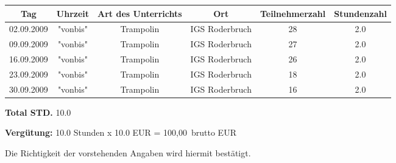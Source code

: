 \documentclass[a4paper,10pt,BCOR=0mm]{scrreprt}
\begin{document}
\begin{flushright}
\begin{tabular}{|c|c|c|c|c|c|}\hline
 \textbf{Tag}
&
 \textbf{Uhrzeit}
&
 \textbf{Art des Unterrichts}
&
\textbf{Ort}
&
\textbf{Teilnehmerzahl}
&
 \textbf{Stundenzahl}\\\hline\hline

02.09.2009
&
"vonbis"
&
Trampolin
&
IGS Roderbruch
&
28
&
2.0
\\\hline


09.09.2009
&
"vonbis"
&
Trampolin
&
IGS Roderbruch
&
27
&
2.0
\\\hline


16.09.2009
&
"vonbis"
&
Trampolin
&
IGS Roderbruch
&
26
&
2.0
\\\hline


23.09.2009
&
"vonbis"
&
Trampolin
&
IGS Roderbruch
&
18
&
2.0
\\\hline


30.09.2009
&
"vonbis"
&
Trampolin
&
IGS Roderbruch
&
16
&
2.0
\\\hline



\end{tabular} 
\begin{flushright}
\parbox{5cm}{\textbf{Total STD.} 10.0}\end{flushright}
\hfill\hfill \textbf{Vergütung:} 10.0 Stunden x 10.0 EUR = 100,00\officialeuro\  brutto EUR \hspace*{2cm}\\
\end{flushright}
\vfill
Die Richtigkeit der vorstehenden Angaben wird hiermit bestätigt.\\
\end{document}
